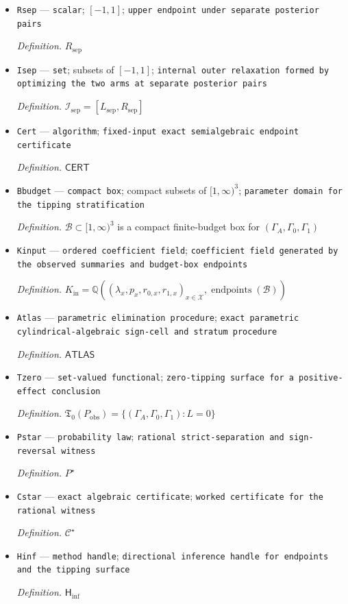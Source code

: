 \documentclass{article}
\begin{document}
\begin{itemize}
  \item \texttt{Rsep} --- \texttt{scalar}; \([-1,1]\); \texttt{upper endpoint under separate posterior pairs}
  \par\smallskip\noindent\emph{Definition.} \(R_{\mathrm{sep}}\)
  \item \texttt{Isep} --- \texttt{set}; subsets of \([-1,1]\); \texttt{internal outer relaxation formed by optimizing the two arms at separate posterior pairs}
  \par\smallskip\noindent\emph{Definition.} \(\mathcal I_{\mathrm{sep}}=[L_{\mathrm{sep}},R_{\mathrm{sep}}]\)
  \item \texttt{Cert} --- \texttt{algorithm}; \texttt{fixed-\allowbreak{}input exact semialgebraic endpoint certificate}
  \par\smallskip\noindent\emph{Definition.} \(\mathsf{CERT}\)
  \item \texttt{Bbudget} --- \texttt{compact box}; compact subsets of \([1,\infty)^3\); \texttt{parameter domain for the tipping stratification}
  \par\smallskip\noindent\emph{Definition.} \(\mathcal B\subset[1,\infty)^3\) is a compact finite-budget box for \((\Gamma_A,\Gamma_0,\Gamma_1)\)
  \item \texttt{Kinput} --- \texttt{ordered coefficient field}; \texttt{coefficient field generated by the observed summaries and budget-\allowbreak{}box endpoints}
  \par\smallskip\noindent\emph{Definition.} \(K_{\mathrm{in}}=\mathbb Q((\lambda_x,p_x,r_{0,x},r_{1,x})_{x\in\mathcal X},\operatorname{endpoints}(\mathcal B))\)
  \item \texttt{Atlas} --- \texttt{parametric elimination procedure}; \texttt{exact parametric cylindrical-\allowbreak{}algebraic sign-\allowbreak{}cell and stratum procedure}
  \par\smallskip\noindent\emph{Definition.} \(\mathsf{ATLAS}\)
  \item \texttt{Tzero} --- \texttt{set-\allowbreak{}valued functional}; \texttt{zero-\allowbreak{}tipping surface for a positive-\allowbreak{}effect conclusion}
  \par\smallskip\noindent\emph{Definition.} \(\mathfrak T_0(P_{\mathrm{obs}})=\{(\Gamma_A,\Gamma_0,\Gamma_1):L=0\}\)
  \item \texttt{Pstar} --- \texttt{probability law}; \texttt{rational strict-\allowbreak{}separation and sign-\allowbreak{}reversal witness}
  \par\smallskip\noindent\emph{Definition.} \(P^\star\)
  \item \texttt{Cstar} --- \texttt{exact algebraic certificate}; \texttt{worked certificate for the rational witness}
  \par\smallskip\noindent\emph{Definition.} \(\mathcal C^\star\)
  \item \texttt{Hinf} --- \texttt{method handle}; \texttt{directional inference handle for endpoints and the tipping surface}
  \par\smallskip\noindent\emph{Definition.} \(\mathsf H_{\mathrm{inf}}\)
\end{itemize}
\end{document}
